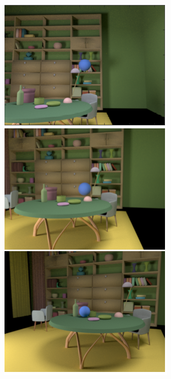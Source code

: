 \documentclass{jov}
\begin{document}
\begin{figure}
	\begin{subfigure}[b]{0.18 \textwidth}
    \centering
        \includegraphics[width=\textwidth]{../Figures/Figure5/Figure5_d.png}

\end{subfigure}
\end{figure}
\end{document}
